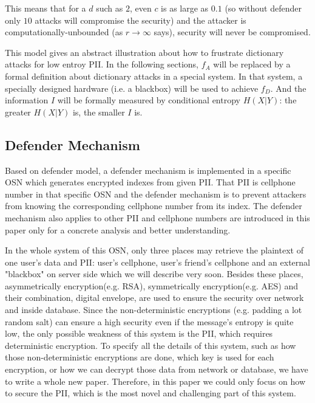 \documentclass[10pt, conference, compsocconf]{IEEEtran}
\begin{document}
        This means that for a $d$ such as $2$, even $c$ is as large as
        $0.1$ (so without defender only $10$ attacks will compromise
        the security) and the attacker is computationally-unbounded
        (as $r \rightarrow \infty$ says), security will
        never be compromised.

        This model gives an abstract illustration about how to frustrate
        dictionary attacks for low entroy PII.
        In the following sections, $f_A$ will be replaced by a formal definition
        about dictionary attacks in a special system.
        In that system, a specially designed hardware (i.e. a blackbox)
        will be used to achieve $f_D$.
        And the information $I$ will be formally
        measured by conditional entropy $H(X|Y)$: the greater $H(X|Y)$
        is, the smaller $I$ is.

    \subsection{Defender Mechanism}\label{sec_ds}
        Based on defender model, a defender mechanism is implemented
        in a specific OSN
        which generates encrypted indexes
        from given PII. That PII is cellphone number
        in that specific OSN and the defender mechanism is to prevent attackers
        from knowing the corresponding cellphone number from its index.
        The defender mechanism also applies to other PII and cellphone numbers are introduced
        in this paper only for a concrete analysis and better understanding.
        
		In the whole system of this OSN, only three places may
        retrieve the plaintext of one user's data and PII: user's cellphone, user's friend's cellphone and an external
        "blackbox" on server side which we will describe very soon. 
        Besides these places, asymmetrically encryption(e.g. RSA), symmetrically encryption(e.g. AES)
        and their combination, digital envelope, are used to ensure the security over network
        and inside database. Since the non-deterministic encryptions (e.g. padding a lot random salt) 
        can ensure a high security even if the message's entropy is quite low, the only possible weakness
        of this system is the PII, which requires deterministic encryption. To specify all the details of
        this system, such as how those non-deterministic encryptions are done, which key is used for each encryption,
        or how we can decrypt those data from network or database, we have to write a whole new paper. Therefore, 
        in this paper we could only focus on how to secure the PII, 
        which is the most novel and challenging part of this system.
        
\end{document}

